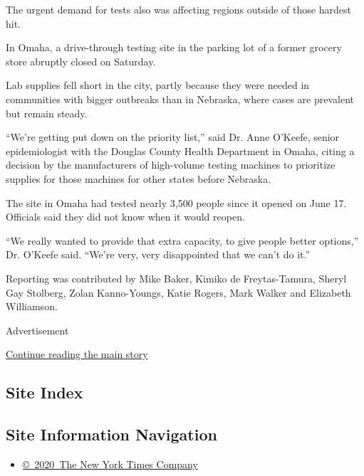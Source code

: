 The urgent demand for tests also was affecting regions outside of those
hardest hit.

In Omaha, a drive-through testing site in the parking lot of a former
grocery store abruptly closed on Saturday.

Lab supplies fell short in the city, partly because they were needed in
communities with bigger outbreaks than in Nebraska, where cases are
prevalent but remain steady.

``We're getting put down on the priority list,'' said Dr. Anne O'Keefe,
senior epidemiologist with the Douglas County Health Department in
Omaha, citing a decision by the manufacturers of high-volume testing
machines to prioritize supplies for those machines for other states
before Nebraska.

The site in Omaha had tested nearly 3,500 people since it opened on June
17. Officials said they did not know when it would reopen.

``We really wanted to provide that extra capacity, to give people better
options,'' Dr. O'Keefe said. ``We're very, very disappointed that we
can't do it.''

Reporting was contributed by Mike Baker, Kimiko de Freytas-Tamura,
Sheryl Gay Stolberg, Zolan Kanno-Youngs, Katie Rogers, Mark Walker and
Elizabeth Williamson.

Advertisement

\protect\hyperlink{after-bottom}{Continue reading the main story}

\hypertarget{site-index}{%
\subsection{Site Index}\label{site-index}}

\hypertarget{site-information-navigation}{%
\subsection{Site Information
Navigation}\label{site-information-navigation}}

\begin{itemize}
\tightlist
\item
  \href{https://help.nytimes3xbfgragh.onion/hc/en-us/articles/115014792127-Copyright-notice}{©~2020~The
  New York Times Company}
\end{itemize}

